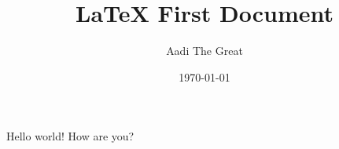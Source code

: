\documentclass{article}
\title{LaTeX First Document}
\author{Aadi The Great}
\date{\today}
\begin{document}
\maketitle
Hello world!  
How are you?
\end{document}
